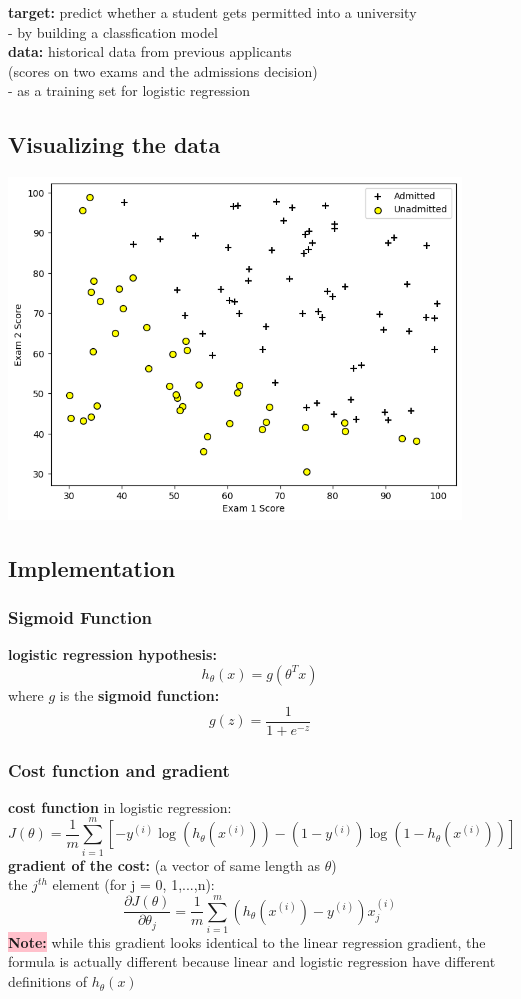 \documentclass[a4paper, 12pt]{book}
\begin{document}
	\noindent \textbf{target: }predict whether a student gets permitted into a university \\
	\indent \indent - by building a classfication model \\
	\textbf{data: }historical data from previous applicants \\ \indent \indent (scores on two exams and the admissions decision) \\ \indent \indent - as a training set for logistic regression
		\subsection{Visualizing the data}
	\includegraphics[width=12cm]{data2} 
		\subsection{Implementation}
			\subsubsection{Sigmoid Function}
	\textbf{logistic regression hypothesis: }
	\[h_\theta(x)=g(\theta^Tx)\]
	where $g$ is the \textbf{sigmoid function: }
	\[g(z)=\frac{1}{1+e^{-z}}\]
			\subsubsection{Cost function and gradient}
	\textbf{cost function} in logistic regression:
	\[
		J(\theta)=\frac{1}{m}\sum_{i=1}^{m}[-y^{(i)}\log(h_\theta(x^{(i)}))-(1-y^{(i)})\log(1-h_\theta(x^{(i)}))]
	\]
	\textbf{gradient of the cost: } (a vector of same length as $\theta$)\\
	the $j^{th}$ element (for j = 0, 1,...,n):
	\[
		\frac{\partial{J(\theta)} }{\partial {\theta_j}}
		=
		\frac{1}{m}  \sum_{i=1}^{m}  (h_\theta(x^{(i)}) - y^{(i)} ) x_j^{(i)}
	\]
	{\bfseries\colorbox{pink}{Note:}} while this gradient looks identical to the linear regression gradient, the formula is actually different because linear and logistic regression
	 have different definitions of \(h_\theta(x)\)
\end{document}
